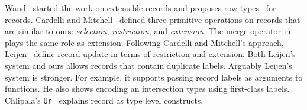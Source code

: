 Wand~\cite{wand1987complete} started the work on extensible records and proposes
row types~\cite{wand1989type} for records. Cardelli and
Mitchell~\cite{cardelli1990operations} defined three primitive operations on
records that are similar to ours: \emph{selection}, \emph{restriction}, and
\emph{extension}. The merge operator in \name plays the same role as extension.
Following Cardelli and Mitchell's approach,
Leijen~\cite{leijen2004first,leijen2005extensible} define record update in terms
of restriction and extension. Both Leijen's system and ours allows records that contain
duplicate labels. Arguably Leijen's system is stronger. For example, it supports
passing record labels as arguments to functions. He also shows encoding an
intersection types using first-class labels. 
Chlipala's
\texttt{Ur}~\cite{chlipala2010ur} explains record as type level
constructs.
\begin{comment}
Our system can be adapted to simulate systems that support extensible
records but not intersection of ordinary types like \texttt{Int} and
\texttt{Float} by allowing only intersection of record types.

$ \turnsrec \tau $ states that $ \tau $ is a record type, or the intersection of
record types, and so forth.

\inferrule [RecBase] {} {\turnsrec \recty l \tau}

\inferrule [RecStep]
{\turnsrec \tau_1 \andalso \turnsrec \tau_2}
{\turnsrec \tau_1 \andop \tau_2}

\inferrule [Merge']
{\Gamma \turns e_1 : \tau_1 \yields {E_1} \andalso \turnsrec \tau_1 \\
 \Gamma \turns e_2 : \tau_2 \yields {E_2} \andalso \turnsrec \tau_2}
{\Gamma \turns e_1 \mergeop e_2 : \tau_1 \andop \tau_2 \yields {\pair {E_1} {E_2}}}

Of course our approach has its limitation as duplicated labels in a record are
allowed. This has been discussed in a larger issue by
Dunfield~\cite{dunfield2014elaborating}.

R{\'e}my~\cite{remy1989type}
\end{comment}
